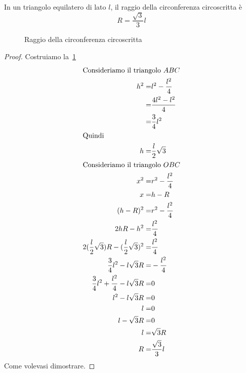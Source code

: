 \begin{thm}\label{thm:raggiocirconferenzacircoscritta}
	In un triangolo equilatero di lato $l$, il raggio della circonferenza circoscritta è \[R=\dfrac{\sqrt{3}}{3}l\]
\end{thm}
\begin{figure}
	\centering
	
	\caption{Raggio della circonferenza circoscritta}
	\label{fig:raggiocirconferenzacircoscritta}
\end{figure}
\begin{proof}
	Costruiamo la~\cref{fig:raggiocirconferenzacircoscritta}
	\begin{align*}
		\intertext{Consideriamo il triangolo $ABC$}
		h^2=&l^2-\dfrac{l^2}{4}\\
		=&\dfrac{4l^2-l^2}{4}\\
		=&\dfrac{3}{4}l^2\\
		\intertext{Quindi}
		h=&\dfrac{l}{2}\sqrt{3}\\
		\intertext{Consideriamo il triangolo $OBC$}
		x^2=&r^2-\dfrac{l^2}{4}\\
		x=&h-R\\
		(h-R)^2=&r^2-\dfrac{l^2}{4}\\
		2hR-h^2=&\dfrac{l^2}{4}\\
		2(\dfrac{l}{2}\sqrt{3})R-(\dfrac{l}{2}\sqrt{3})^2=&\dfrac{l^2}{4}\\
		\dfrac{3}{4}l^2-l\sqrt{3}R=&-\dfrac{l^2}{4}\\
		\dfrac{3}{4}l^2+\dfrac{l^2}{4}-l\sqrt{3}R=&0\\
		l^2-l\sqrt{3}R=&0\\
		l=&0\\
		l-\sqrt{3}R=&0\\
		l=&\sqrt{3}R\\
		R=&\dfrac{\sqrt{3}}{3}l
	\end{align*}
	Come volevasi dimostrare.
\end{proof}